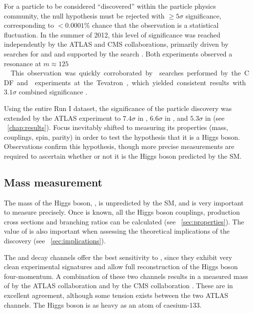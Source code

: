 
For a particle to be considered ``discovered'' within the particle physics community, 
the null hypothesis must be rejected with $\geq\!5\sigma$ significance, 
corresponding to $<0.0001\%$ chance that the observation is a statistical fluctuation.
In the summer of 2012, this level of significance was reached independently by the ATLAS 
and CMS collaborations, primarily driven by searches for \HepProcess{\PHiggs \HepTo 
\Pphoton\Pphoton} and \HepProcess{\PHiggs \HepTo \PZ\PZ} and supported by the \HWW search 
\cite{ATLAS-discovery,CMS-discovery}. Both experiments observed a resonance at 
\unit{$m \approx 125$}{\GeV}.

This observation was quickly corroborated by \HepProcess{\PV\PHiggs \HepTo 
\PV\Pbottom\APbottom} searches performed by the CDF and \dzero experiments at the Tevatron, 
which yielded consistent results with $3.1\sigma$ combined significance 
\cite{Tevatron:2012}.

Using the entire Run I dataset, the significance of the particle discovery was extended 
by the ATLAS experiment to $7.4\sigma$ in \HepProcess{\PHiggs \HepTo \Pphoton\Pphoton} 
\cite{ATLAS:combination:2013}, $6.6\sigma$ in \HepProcess{\PHiggs \HepTo \PZ\PZ} 
\cite{ATLAS:combination:2013}, and $5.3\sigma$ in \HWW (see 
\Chapter~\ref{chap:results}). Focus inevitably shifted to measuring its properties (mass, 
couplings, spin, parity) in order to test the hypothesis that it is a Higgs boson.
Observations confirm this hypothesis, though more precise measurements are required to 
ascertain whether or not it is the Higgs boson predicted by the SM.



\subsection{Mass measurement}
\label{sec:searches:mass}

The mass of the Higgs boson, \mH, is unpredicted by the SM, and is very important to 
measure precisely. Once \mH is known, all the Higgs boson couplings, production cross 
sections and branching ratios can be calculated (see \Section~\ref{sec:properties}). The 
value of \mH is also important when assessing the theoretical implications of the 
discovery (see \Section~\ref{sec:implications}).

The \HepProcess{\PHiggs \HepTo \Pphoton\Pphoton} and \HepProcess{\PHiggs \HepTo \PZ\PZ} 
decay channels offer the best sensitivity to \mH, since they exhibit very clean 
experimental signatures and allow full reconstruction of the Higgs boson four-momentum.
A combination of these two channels results in a measured mass of 
\unit{}{\GeV} by the ATLAS collaboration \cite{ATLAS:mass} 
and \unit{}{\GeV} by the CMS collaboration \cite{CMS:mass}. 
These are in excellent agreement, although some tension exists between the two ATLAS 
channels. The Higgs boson is as heavy as an atom of caesium-133.

